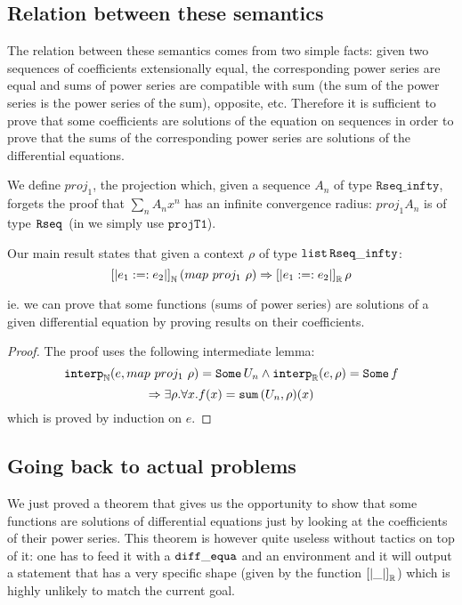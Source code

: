 \documentclass{article}
\begin{document}
\subsection{Relation between these semantics}

The relation between these semantics comes from two simple facts: given two
sequences of coefficients extensionally equal, the corresponding power
series are equal and sums of power series are compatible with sum (the sum
of the power series is the power series of the sum), opposite, etc.
Therefore it is sufficient to prove that some coefficients are solutions of
the equation on sequences in order to prove that the sums of the corresponding
power series are solutions of the differential equations.

We define $proj_1$, the projection which, given a sequence $A_n$ of type
$\mathtt{Rseq\_infty}$, forgets the proof that $\sum_n A_n x^n$ has an
infinite convergence radius: $proj_1 A_n$ is of type $\operatorname{\mathtt{Rseq}}{}$ (in \coq{} we
simply use $\mathtt{projT1}$).

\begin{theorem} Our main result states that given a context
$\rho$ of type $\operatorname{\mathtt{list}}{} \mathtt{Rseq\_infty}$:
$$\left[\left| e_1 :=: e_2 \right|\right]_{\mathbb{N}} (map ~ proj_1 ~ \rho) \Rightarrow
\left[\left| e_1 :=: e_2 \right|\right]_{\mathbb{R}} \rho$$

ie. we can prove that some functions (sums of power series) are solutions
of a given differential equation by proving results on their coefficients.
\end{theorem}

\begin{proof} The proof uses the following intermediate lemma:
$$\operatorname{\operatorname{\mathtt{interp}}_{\mathbb{N}}}(e, map ~ proj_1 ~ \rho) = \operatorname{\mathtt{Some}} U_n \wedge \operatorname{\operatorname{\mathtt{interp}}_{\mathbb{R}}}(e, \rho) = \operatorname{\mathtt{Some}} f$$
$$\Rightarrow \exists \rho. \forall x. f(x) = \operatorname{\mathtt{sum}}{}(U_n, \rho)(x)$$
which is proved by induction on $e$.
\end{proof}

\subsection{Going back to actual problems}

We just proved a theorem that gives us the opportunity to show that some functions
are solutions of differential equations just by looking at the coefficients of
their power series. This theorem is however quite useless without tactics on top
of it: one has to feed it with a $\operatorname{\mathtt{diff\_equa}}$ and an environment and it will output a
statement that has a very specific shape (given by the function $\left[\left|
 \_ \right|\right]_{\mathbb{R}}$) which is highly unlikely to match the current goal.
\end{document}
